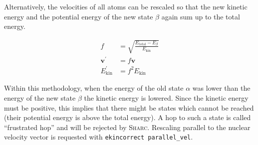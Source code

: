 \documentclass[a4paper,11pt,DIV=15,openany,twoside=false]{scrbook}
\newcommand{\tthdump}[1]{#1}
\newcommand{\sharc}{\textsc{Sharc}}
\newcommand{\ttt}[1]{\texttt{#1}}
\renewcommand{\vec}[1]{\ensuremath{\mathbf{#1}}}
\begin{document}
Alternatively, the velocities of all atoms can be rescaled so that the new kinetic energy and the potential energy of the new state $\beta$ again sum up to the total energy.
\tthdump{
  \begin{align}
    f&=\sqrt{\frac{E_{\text{total}}-E_\beta}{E_{\text{kin}}}}\\
    \vec{v}^\prime&=f\vec{v}\\
    E_{\text{kin}}^\prime&=f^2E_{\text{kin}}
  \end{align}
}
Within this methodology, when the energy of the old state $\alpha$ was lower than the energy of the new state $\beta$ the kinetic energy is lowered. Since the kinetic energy must be positive, this implies that there might be states which cannot be reached (their potential energy is above the total energy). A hop to such a state is called ``frustrated hop'' and will be rejected by \sharc. Rescaling parallel to the nuclear velocity vector is requested with \ttt{ekincorrect parallel\_vel}.
\end{document}
